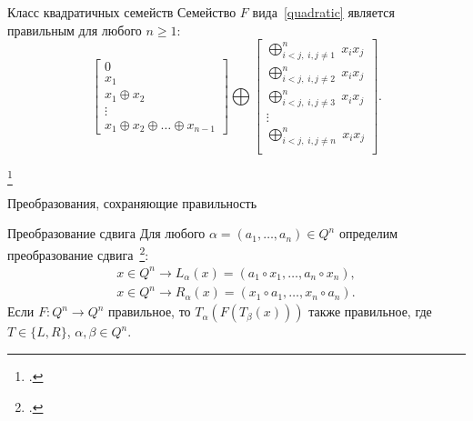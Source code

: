 \begin{frame}%
    \begin{mytheorem}{Класс квадратичных семейств}
        Семейство $F$ вида~\ref{quadratic} является правильным для любого $n \ge 1$:
        \begin{equation}
            \label{quadratic}
            \begin{bmatrix}
            0 \\
            x_1 \\
            x_1 \oplus x_2 \\
            \vdots \\
            x_1 \oplus x_2 \oplus \ldots \oplus x_{n-1}
            \end{bmatrix}
            \bigoplus
            \begin{bmatrix}
            \bigoplus_{i < j, \; i, j \ne 1}^n \; x_i x_j \\
            \bigoplus_{i < j, \; i, j \ne 2}^n \; x_i x_j \\
            \bigoplus_{i < j, \; i, j \ne 3}^n \; x_i x_j \\
            \vdots \\
            \bigoplus_{i < j, \; i, j \ne n}^n \; x_i x_j \\
            \end{bmatrix}.
        \end{equation}
    \end{mytheorem}
    \footcitetext{dm21}
\end{frame}


\begin{frame}{Преобразования, сохраняющие правильность}
    \begin{mypropos}{Преобразование сдвига}
        \label{thm:shift}
        Для любого $\alpha = (a_1, \ldots, a_n) \in Q^n$ определим преобразование сдвига~\footcite{nosov08}:
        \begin{gather*}
            x \in Q^n \to L_{\alpha}(x) = (a_1 \circ x_1, \ldots, a_n \circ x_n), \\
            x \in Q^n \to R_{\alpha}(x) = (x_1 \circ a_1, \ldots, x_n \circ a_n).
        \end{gather*}
        \pause
        Если $F \colon Q^n \to Q^n$ правильное, то $T_{\alpha}(F(T_{\beta}(x)))$ также правильное, где $T \in \{L, R\}$, $\alpha, \beta \in Q^n$.
    \end{mypropos}
\end{frame}


